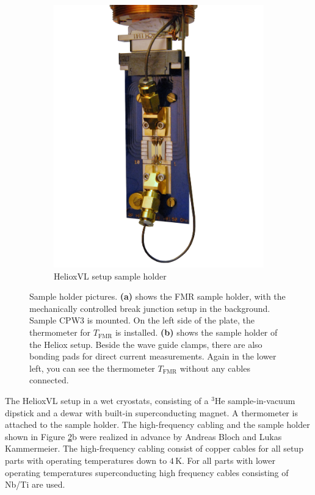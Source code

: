 \begin{figure}
\begin{subfigure}[b]{.45\textwidth}
         \includegraphics[width=\textwidth]{setup/holder/FH_freecut.jpg}
         \caption{HelioxVL setup sample holder}
         \label{fig:setup_photo_heliox}
     \end{subfigure}
        \caption[Sample holder pictures]{Sample holder pictures. \textbf{(a)} shows the FMR sample holder, with the mechanically controlled break junction setup in the background. Sample CPW3 is mounted. On the left side of the plate, the thermometer for $T_\text{FMR}$ is installed. \textbf{(b)} shows the sample holder of the Heliox setup. Beside the wave guide clamps, there are also bonding pads for direct current measurements. Again in the lower left, you can see the thermometer $T_\text{FMR}$ without any cables connected.}
        \label{fig:setup_photo}
\end{figure}

The HelioxVL setup in a wet cryostats, consisting of a $^3$He sample-in-vacuum dipstick and a dewar with built-in superconducting magnet. A thermometer is attached to the sample holder. The high-frequency cabling and the sample holder shown in Figure \ref{fig:setup_photo}b were realized in advance by Andreas Bloch and Lukas Kammermeier. The high-frequency cabling consist of copper cables for all setup parts with operating temperatures down to $4\,$K. For all parts with lower operating temperatures superconducting high frequency cables consisting of Nb/Ti are used.

